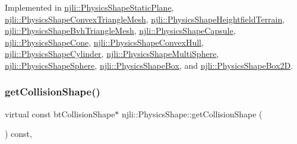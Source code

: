 Implemented in \mbox{\hyperlink{classnjli_1_1_physics_shape_static_plane_ae40c449320efcf3c483e7ff67b68b812}{njli\+::\+Physics\+Shape\+Static\+Plane}}, \mbox{\hyperlink{classnjli_1_1_physics_shape_convex_triangle_mesh_af468a2dcbc7bea9b1c7fc4cefd381f6f}{njli\+::\+Physics\+Shape\+Convex\+Triangle\+Mesh}}, \mbox{\hyperlink{classnjli_1_1_physics_shape_heightfield_terrain_a730f6ff1a72fc73f43c2daedf82b46e4}{njli\+::\+Physics\+Shape\+Heightfield\+Terrain}}, \mbox{\hyperlink{classnjli_1_1_physics_shape_bvh_triangle_mesh_ae178ec3b2606f34fd8a5a659be3f202a}{njli\+::\+Physics\+Shape\+Bvh\+Triangle\+Mesh}}, \mbox{\hyperlink{classnjli_1_1_physics_shape_capsule_adf81c202808451b499e665d7db4a2e93}{njli\+::\+Physics\+Shape\+Capsule}}, \mbox{\hyperlink{classnjli_1_1_physics_shape_cone_a16dabd0490dfc7d3c5695ab39939f692}{njli\+::\+Physics\+Shape\+Cone}}, \mbox{\hyperlink{classnjli_1_1_physics_shape_convex_hull_a90c6c121436e997379305a4fe66bde0c}{njli\+::\+Physics\+Shape\+Convex\+Hull}}, \mbox{\hyperlink{classnjli_1_1_physics_shape_cylinder_aa8ed8409e1a6ba5ed2c5de028558425a}{njli\+::\+Physics\+Shape\+Cylinder}}, \mbox{\hyperlink{classnjli_1_1_physics_shape_multi_sphere_a9a1d33140c781451ceccc749e0233033}{njli\+::\+Physics\+Shape\+Multi\+Sphere}}, \mbox{\hyperlink{classnjli_1_1_physics_shape_sphere_ac5c2b0aa40a78763720fc47fe3d6693d}{njli\+::\+Physics\+Shape\+Sphere}}, \mbox{\hyperlink{classnjli_1_1_physics_shape_box_af0500ac8a54d96ada3a3ab1b775fdd76}{njli\+::\+Physics\+Shape\+Box}}, and \mbox{\hyperlink{classnjli_1_1_physics_shape_box2_d_a176b8cfb4df192e48295adc6e97a1e8d}{njli\+::\+Physics\+Shape\+Box2D}}.

\mbox{\label{classnjli_1_1_physics_shape_a527e956caca24bf16ed0d47f69ff14e8}} 
\subsubsection{\texorpdfstring{get\+Collision\+Shape()}{getCollisionShape()}\hspace{0.1cm}{\footnotesize\ttfamily [1/2]}}
{\footnotesize\ttfamily virtual const bt\+Collision\+Shape$\ast$ njli\+::\+Physics\+Shape\+::get\+Collision\+Shape (\begin{DoxyParamCaption}{ }\end{DoxyParamCaption}) const\hspace{0.3cm}{\ttfamily [protected]}, {}}




